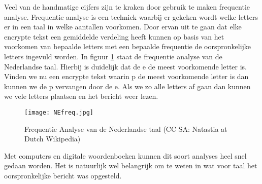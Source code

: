 Veel van de handmatige cijfers zijn te kraken door gebruik te maken frequentie analyse. Frequentie analyse is een techniek waarbij er gekeken wordt welke letters er in een taal in welke aantallen voorkomen. Door ervan uit te gaan dat elke encrypte tekst een gemiddelde verdeling heeft kunnen op basis van het voorkomen van bepaalde letters met een bepaalde frequentie de oorspronkelijke letters ingevuld worden. In figuur \ref{fig:NEfreq} staat de frequentie analyse van de Nederlandse taal. Hierbij is duidelijk dat de e de meest voorkomende letter is. Vinden we nu een encrypte tekst waarin p de meest voorkomende letter is dan kunnen we de p vervangen door de e. Als we zo alle letters af gaan dan kunnen we vele letters plaatsen en het bericht weer lezen.

\begin{figure}[h]
	\texttt{[image: NEfreq.jpg]}
	\caption{Frequentie Analyse van de Nederlandse taal (CC SA: Natastia at Dutch Wikipedia)}
	\label{fig:NEfreq}
\end{figure}

Met computers en digitale woordenboeken kunnen dit soort analyses heel snel gedaan worden. Het is natuurlijk wel belangrijk om te weten in wat voor taal het oorspronkelijke bericht was opgesteld.
